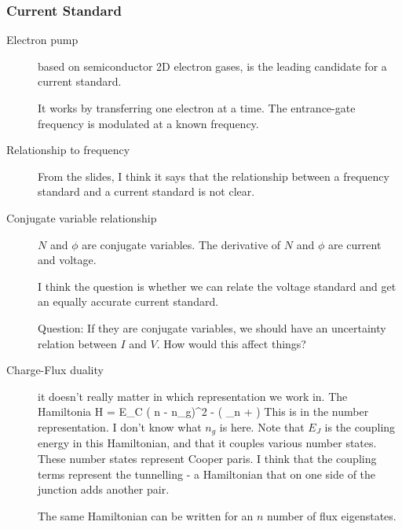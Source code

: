 \subsubsection{Current Standard}
\begin{description}
\item[Electron pump] based on semiconductor 2D electron gases, is the leading candidate for a current standard. 

It works by transferring one electron at a time. The entrance-gate frequency is modulated at a known frequency. 

\item[Relationship to frequency] From the slides, I think it says that the relationship between a frequency standard and a current standard is not clear. 

\item[Conjugate variable relationship] $N$ and  $\phi$ are conjugate variables. The derivative of $N$ and $\phi$ are current and voltage. 

I think the question is whether we can relate the voltage standard and get an equally accurate current standard. 

Question: If they are conjugate variables, we should have an uncertainty relation between $I$ and $V$. How would this affect things? 

\item[Charge-Flux duality] it doesn't really matter in which representation we work in. The Hamiltonia
\beq
H = E_C ( n - n_g)^2 - \left(  \sum_n  +  \right)
\eeq
This is in the number representation. I don't know what $n_g$ is here. Note that $E_J$ is the coupling energy in this Hamiltonian, and that it couples various number states. These number states represent Cooper paris. I think that the coupling terms represent the tunnelling - a Hamiltonian that on one side of the junction adds another pair. 

The same Hamiltonian can be written for an $n$ number of flux eigenstates. 

\end{description}
